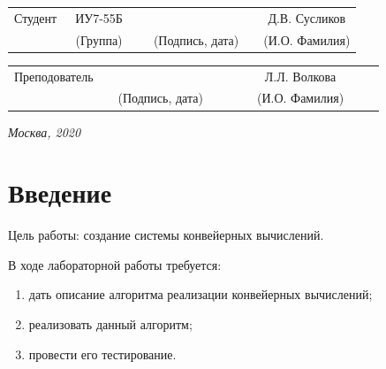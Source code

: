 \documentclass[14pt, a4paper]{extarticle}
\begin{document}
	
	\noindent
	\\
	
	\noindent
	\\
	
	\vspace{1.5cm}
	\noindent
	\begin{tabular}{l c c c c c}
		Студент      & ~ИУ7-55Б~               & \hspace{2.5cm} & \hspace{2cm}                 & &  Д.В. 
		Сусликов \\\cline{2-2}\cline{4-4} \cline{6-6} 
		\hspace{3cm} & {\footnotesize(Группа)} &                & {\footnotesize(Подпись, дата)} & & {\footnotesize(И.О. Фамилия)}
	\end{tabular}
	
	\noindent
	\begin{tabular}{l c c c c}
		Преподователь & \hspace{5cm}   & \hspace{2cm}                 & & ~~~~~~Л.Л. Волкова~~~~~~\\\cline{3-3} \cline{5-5} 
		\hspace{3cm}  &                & {\footnotesize(Подпись, дата)} & & {\footnotesize(И.О. Фамилия)}
	\end{tabular}
	
	\vspace{0.6cm}
	\begin{center}	
		\vfill
		\large \textit {Москва, 2020}
	\end{center}
	
	\thispagestyle {empty}
	\pagebreak
	
	\clearpage
	\tableofcontents
	
	
	\clearpage
	\section*{Введение}
	Цель работы: создание системы конвейерных вычислений.\par
	В ходе лабораторной работы требуется:
	\begin{enumerate}
		\item[1)] дать описание алгоритма реализации конвейерных вычислений;
		\item[2)] реализовать данный алгоритм;
		\item[3)] провести его тестирование.
	\end{enumerate}\par
	 
\end{document}
